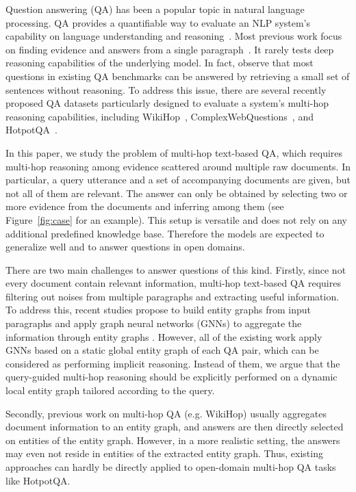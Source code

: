 \documentclass[11pt,a4paper]{article}
\newcommand{\hotpotqa}{HotpotQA\xspace}
\begin{document}
Question answering (QA) has been a popular topic in natural language processing. 
QA provides a quantifiable way to evaluate an NLP system's capability on language understanding and reasoning~\cite{hermann2015teaching,rajpurkar2016squad,rajpurkar2018know}.
Most previous work focus on finding evidence and answers from a single paragraph~\cite{seo2016bidirectional,liu2017stochastic,wang2017gated}.
It rarely tests deep reasoning capabilities of the underlying model. 
In fact,  observe that most questions in existing QA benchmarks can be answered by retrieving a small set of sentences without reasoning. 
To address this issue, there are several recently proposed QA datasets particularly designed to evaluate a system's 
multi-hop reasoning capabilities, including WikiHop~\cite{welbl2018constructing}, ComplexWebQuestions~\cite{talmor2018web}, and HotpotQA~\cite{yang2018hotpotqa}.

In this paper, we study the problem of multi-hop text-based QA, 
which requires multi-hop reasoning among evidence scattered around multiple raw documents. 
In particular, a query utterance and a set of accompanying documents are given, but not all of them are relevant. 
The answer can only be obtained by selecting two or more evidence from the documents and inferring among them (see Figure~\ref{fig:case} for an example). 
This setup is versatile and does not rely on any additional predefined knowledge base. 
Therefore the models are expected to generalize well and to answer questions in open domains. 







There are two main challenges to answer questions of this kind. 
Firstly, since not every document contain relevant information, 
multi-hop text-based QA requires filtering out noises from multiple paragraphs and extracting useful information.
To address this, recent studies propose to build entity graphs from input paragraphs and apply graph neural networks (GNNs) to aggregate the information through entity graphs \cite{dhingra2018neural,de2018question,song2018exploring}.
However, all of the existing work apply GNNs based on a static global entity graph of each QA pair, which can be considered as performing implicit reasoning.
Instead of them, we argue that the query-guided multi-hop reasoning should be explicitly performed on a dynamic local entity graph tailored according to the query. 

Secondly, previous work on multi-hop QA (e.g. WikiHop) usually aggregates document information to an entity graph, and answers are then directly selected on entities of the entity graph.
However, in a more realistic setting, the answers may even not reside in entities of the extracted entity graph.
Thus, existing approaches can hardly be directly applied to open-domain multi-hop QA tasks like \hotpotqa.
\end{document}
